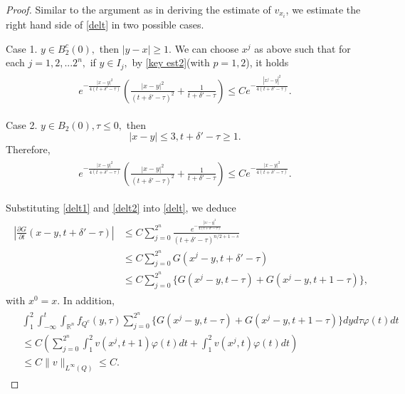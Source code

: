 \documentclass[10pt,a4paper]{amsart}
\newcommand{\R}{\mathbb{R}}
\begin{document}
\begin{proof}
Similar to the argument as in deriving the estimate of $v_{x_i}$, we estimate the right hand side of  \eqref{delt} in two possible cases.

Case 1. $y\in B_2^c(0),$ then $|y-x|\geq 1.$ We can choose $x^j$ as above such that for each $j=1,2,...2^n,$ if $y\in I_j,$ by \eqref{key est2}(with $p=1,2$), it holds
\begin{eqnarray}\label{delt1}
\begin{aligned}e^{-\frac{|x-y|^2}{4(t+\delta'-\tau)}}\left(\frac{|x-y|^2}{(t+\delta'-\tau)^2}+\frac{1}{t+\delta'-\tau}\right)\leq Ce^{-\frac{|x^j-y|^2}{4(t+\delta'-\tau)}}.
\end{aligned}
\end{eqnarray}

Case 2. $y\in B_2(0), \tau\leq 0,$ then
\[|x-y|\leq 3, t+\delta'-\tau\geq1.\]
Therefore,
\begin{eqnarray}\label{delt2}
\begin{aligned}e^{-\frac{|x-y|^2}{4(t+\delta'-\tau)}}\left(\frac{|x-y|^2}{(t+\delta'-\tau)^2}+\frac{1}{t+\delta'-\tau}\right)\leq Ce^{-\frac{|x-y|^2}{4(t+\delta'-\tau)}}.
\end{aligned}
\end{eqnarray}

Substituting \eqref{delt1} and \eqref{delt2} into \eqref{delt}, we deduce
\begin{eqnarray}\label{delt3}
\begin{aligned}\left|\frac{\partial G}{\partial t}(x-y,t+\delta'-\tau)\right|&\leq C\sum\limits_{j=0}^{2^n}\frac{e^{-\frac{|x^j-y|^2}{4(t+\delta'-\tau)}}}{{(t+\delta'-\tau)}^{n/2+1-s}}\\
&\leq  C\sum\limits_{j=0}^{2^n} G(x^j-y,t+\delta'-\tau)\\
&\leq  C\sum\limits_{j=0}^{2^n}\{ G(x^j-y,t-\tau)+ G(x^j-y,t+1-\tau)\},\end{aligned}
\end{eqnarray}
{with} $x^0=x$.
In addition,
\begin{eqnarray}\label{delt4}
\begin{aligned}&\int_1^2\int_{-\infty}^{t}\int_{\R^n}f_{Q^c}(y,\tau)\sum\limits_{j=0}^{2^n}\{ G(x^j-y,t-\tau)+ G(x^j-y,t+1-\tau)\}dyd\tau\varphi(t)dt\\
&\leq C\left(\sum\limits_{j=0}^{2^n}\int_1^2{v(x^j,t+1)\varphi(t)dt+\int_1^2v(x^j,t)}\varphi(t)dt\right)\\
&\leq C \|v\|_{L^{\infty}(Q)}\leq C.\end{aligned}
\end{eqnarray}


\end{proof}
\end{document}
